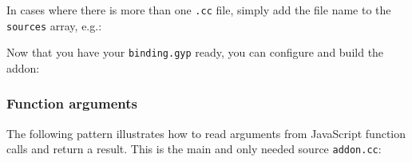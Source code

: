 In cases where there is more than one \texttt{.cc} file, simply add the
file name to the \texttt{sources} array, e.g.:

\begin{Shaded}
\begin{Highlighting}[]
\NormalTok{: [}\NormalTok{, }\NormalTok{]}
\end{Highlighting}
\end{Shaded}

Now that you have your \texttt{binding.gyp} ready, you can configure and
build the addon:

\begin{Shaded}
\begin{Highlighting}[]
\end{Highlighting}
\end{Shaded}

\subsubsection{Function arguments}

The following pattern illustrates how to read arguments from JavaScript
function calls and return a result. This is the main and only needed
source \texttt{addon.cc}:

